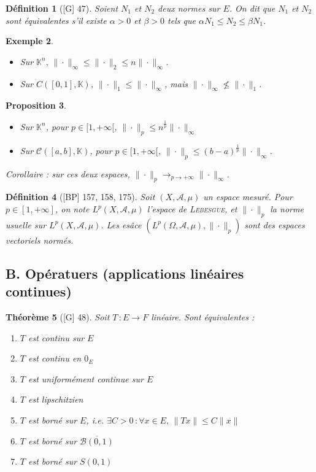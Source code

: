\documentclass[10pt, a4paper, parskip=full, twoside, twocolumn]{report}
\newtheorem{definition}{Définition}
\newtheorem{theorem}[definition]{Théorème}
\newtheorem{proposition}[definition]{Proposition}
\newtheorem{example}[definition]{Exemple}
\newcommand{\IK}{\mathbb{K}}
\newcommand{\B}{\mathcal{B}}
\newcommand{\A}{\mathcal{A}}
\begin{document}
\begin{definition}[\textnormal{[G] 47}]
	Soient $N_1$ et $N_2$ deux normes sur $E$. On dit que $N_1$ et $N_2$ sont \emph{équivalentes} s'il existe $\alpha > 0$ et $\beta > 0$ tels que $\alpha N_1\leq N_2\leq \beta N_1$.
\end{definition}

\begin{example}
	\begin{itemize}
		\item Sur $\IK^n,\,\|\cdot\|_{\infty}\leq \|\cdot\|_2\leq n\|\cdot\|_{\infty}$.
		\item Sur $C([0,1], \IK)$, $\|\cdot\|_1 \leq \|\cdot\|_{\infty}$, mais $\|\cdot\|_{\infty}\not \leq  \|\cdot\|_1$.
	\end{itemize}
\end{example}

\begin{proposition}
	\begin{itemize}
		\item Sur $\IK^n$, pour $p\in[1,+\infty[$, $\|\cdot\|_p\leq n^{\frac{1}{p}}\|\cdot\|_{\infty}$
		\item Sur $\mathcal{C}([a,b],\IK)$, pour $p\in[1,+\infty[$, $\|\cdot\|_p\leq (b-a)^{\frac{1}{p}}\|\cdot\|_{\infty}$.
	\end{itemize}

	Corollaire : sur ces deux espaces, $\|\cdot\|_p \to_{p\to +\infty}\|\cdot\|_{\infty}$.
\end{proposition}

\begin{definition}[\textnormal{[BP] 157, 158, 175}]
	Soit $(X,\A,\mu)$ un espace mesuré. Pour $p\in [1,+\infty]$, on note $L^p(X,\A, \mu)$ l'\emph{espace de \textsc{Lebesgue}}, et $\|\cdot\|_p$ la norme usuelle sur $L^p(X,\A,\mu)$.
	Les esâce $\left(L^p(\Omega,\A,\mu), \|\cdot\|_p\right)$ sont des espaces vectoriels normés.
\end{definition}

\subsection*{B. Opératuers (applications linéaires continues)}

\begin{theorem}[\textnormal{[G] 48}]
	Soit $T\,\colon E\to F$ linéaire. Sont équivalentes :
	\begin{enumerate}
		\item $T$ est continu sur $E$
		\item $T$ est continu en $0_E$
		\item $T$ est uniformément continue sur $E$
		\item $T$ est lipschitzien 
		\item $T$ est borné sur $E$, \emph{i.e.} $\exists C>0\,\colon \forall x\in E,\,\|Tx\| \leq C\|x\|$
		\item $T$ est borné sur $\overline{\B(0,1)}$
		\item $T$ est borné sur $S(0,1)$
	\end{enumerate}
\end{theorem}
\end{document}
